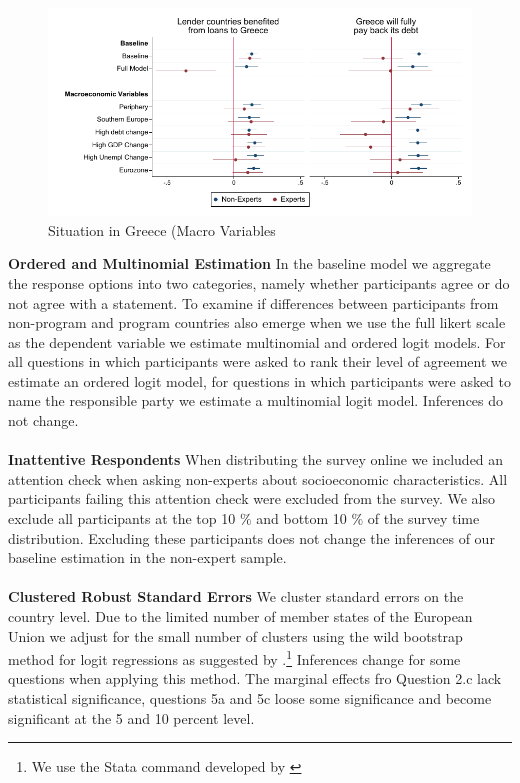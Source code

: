 \begin{figure}[h!]
    \begin{center}
     \caption{Situation in Greece (Macro Variables}
    \includegraphics[scale=1.2]{macro_S_1601_S_1701.pdf}
    \end{center}
    \tiny
\end{figure}
    \clearpage
\textbf{Ordered and Multinomial Estimation}
In the baseline model we aggregate the response options into two categories, namely whether participants agree or do not agree with a statement.  To examine if differences between participants from non-program and program countries also emerge when we use the full likert scale as the dependent variable we estimate multinomial and ordered logit models. For all questions in which participants were asked to rank their level of agreement we estimate an ordered logit model, for questions in which participants were asked to name the responsible party we estimate a multinomial logit model. Inferences do not change.\\

\\
\textbf{Inattentive Respondents}
When distributing the survey online we included an attention check when asking non-experts about socioeconomic characteristics. All participants failing this attention check were excluded from the survey. We also exclude all participants at the top 10 $\%$ and bottom 10 $\%$ of the survey time distribution. Excluding these participants does not change the inferences of our baseline estimation in the non-expert sample.\\


\\
\textbf{Clustered Robust Standard Errors} 
We cluster standard errors on the country level. Due to the limited number of member states of the European Union we adjust for the small number of clusters using the wild bootstrap method for logit regressions as suggested by \cite{cameron}.\footnote{We use the Stata command developed by \cite{roodman}} Inferences change for some questions when applying this method. The marginal effects fro Question 2.c lack statistical significance, questions 5a and 5c loose some significance and become significant at the 5 and 10 percent level.  \\

